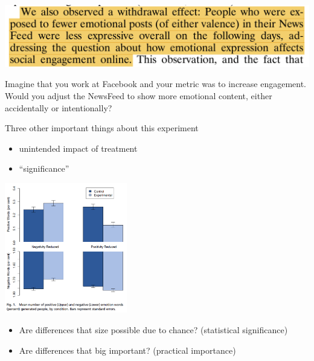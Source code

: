 \documentclass[aspectratio=169]{beamer}
\begin{document}
\begin{frame}

\begin{center}
\includegraphics[width=\textwidth]{figures/kramer_experimental_2014_withdraw_effect}
\end{center}
\vfill
Imagine that you work at Facebook and your metric was to increase engagement. \pause Would you adjust the NewsFeed to show more emotional content, either accidentally or intentionally?  

\end{frame}
\begin{frame}

Three other important things about this experiment
\begin{itemize}
\item unintended impact of treatment
\item ``significance''
\end{itemize}

\end{frame}
\begin{frame}

\begin{center}
\includegraphics[width=0.4\textwidth]{figures/kramer_experimental_2014_fig1}
\end{center}

\begin{itemize}
\item Are differences that size possible due to chance? (statistical significance)\pause
\item Are differences that big important? (practical importance)
\end{itemize}

\end{frame}
\end{document}
